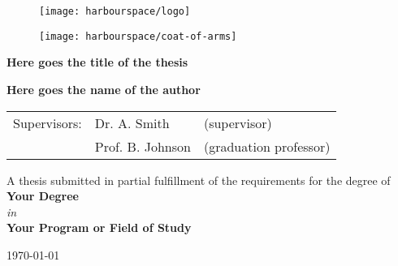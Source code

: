 \begin{figure}[h]
    \texttt{[image: harbourspace/logo]}
    \centering
\end{figure}

\vspace{1cm}

\begin{figure}[h]
    \texttt{[image: harbourspace/coat-of-arms]}
    \centering
\end{figure}

\vspace{1cm}

\begin{center}
    \LARGE\textbf{Here goes the title of the thesis}
\end{center}

\vspace{0.5cm}

\begin{center}
    \Large\textbf{Here goes the name of the author}
\end{center}

\begin{center}
    \begin{tabular}{lll}
        Supervisors: & Dr. A. Smith     & (supervisor)           \\
                     & Prof. B. Johnson & (graduation professor)
    \end{tabular}
\end{center}

\vspace{0.5cm}

\vfill

\begin{center}
    A thesis submitted in partial fulfillment
    of the requirements for the degree of\\
    \textbf{Your Degree}\\[0.5cm] %
    \textit{in}\\
    \textbf{Your Program or Field of Study}\\[1cm] %
\end{center}

\vspace{0.5cm}

\begin{center}
    \today
\end{center}